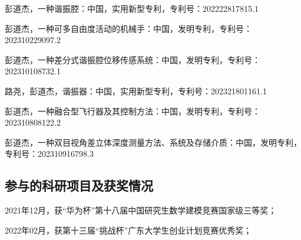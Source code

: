 \begin{resume}
  \begin{achievements}
    \item 彭道杰，一种谐振腔：中国，实用新型专利，专利号：202222817815.1
    \item 彭道杰，一种可多自由度活动的机械手：中国，发明专利，专利号：202310229097.2
    \item 彭道杰，一种差分式谐振腔位移传感系统：中国，发明专利，专利号：202310108732.1
    \item 路尧，彭道杰，谐振器：中国，实用新型专利，专利号：202321801161.1
    \item 彭道杰，一种融合型飞行器及其控制方法：中国，发明专利，专利号：202310808122.2
    \item 彭道杰，一种双目视角差立体深度测量方法、系统及存储介质：中国，发明专利，专利号：202310916798.3
  \end{achievements}

  \subsection*{参与的科研项目及获奖情况}
  \begin{achievements}
    \item   2021年12月，获“华为杯”第十八届中国研究生数学建模竞赛国家级三等奖；
    \item 2022年02月，获第十三届“挑战杯”广东大学生创业计划竞赛优秀奖；
  \end{achievements}

\end{resume}
